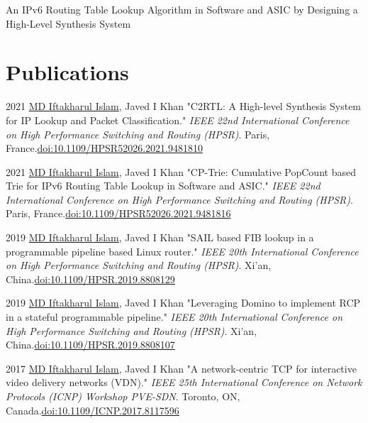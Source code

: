 \documentclass[11pt,letterpaper]{report}
\begin{document}
	An IPv6 Routing Table Lookup Algorithm in Software and ASIC by Designing a High-Level Synthesis System



    \section*{Publications}



    \begin{tablist}
        \item[2021] \tab{}\underline{MD Iftakharul Islam}, Javed I Khan "C2RTL: A High-level Synthesis System for IP Lookup and Packet Classification." \textit{IEEE 22nd International Conference on High Performance Switching and Routing (HPSR)}. Paris, France.\@ \href{https://ieeexplore.ieee.org/document/9481810}{doi:10.1109/HPSR52026.2021.9481810}
    	
        \item[2021] \tab{}\underline{MD Iftakharul Islam}, Javed I Khan "CP-Trie: Cumulative PopCount based Trie for IPv6 Routing Table Lookup in Software and ASIC." \textit{IEEE 22nd International Conference on High Performance Switching and Routing (HPSR)}. Paris, France.\@ \href{https://ieeexplore.ieee.org/document/9481816}{doi:10.1109/HPSR52026.2021.9481816}

        \item[2019] \tab{}\underline{MD Iftakharul Islam}, Javed I Khan "SAIL based FIB lookup in a programmable pipeline based Linux router." \textit{IEEE 20th International Conference on High Performance Switching and Routing (HPSR)}. Xi'an, China.\@ \href{https://ieeexplore.ieee.org/document/8808129}{doi:10.1109/HPSR.2019.8808129}

        \item[2019] \tab{}\underline{MD Iftakharul Islam}, Javed I Khan "Leveraging Domino to implement RCP in a stateful programmable pipeline." \textit{IEEE 20th International Conference on High Performance Switching and Routing (HPSR)}. Xi'an, China.\@ \href{https://ieeexplore.ieee.org/document/8808107}{doi:10.1109/HPSR.2019.8808107}
        
        \item[2017] \tab{}\underline{MD Iftakharul Islam}, Javed I Khan "A network-centric TCP for interactive video delivery networks (VDN)." \textit{IEEE 25th International Conference on Network Protocols (ICNP) Workshop PVE-SDN}. Toronto, ON, Canada.\@ \href{https://ieeexplore.ieee.org/document/8117596}{doi:10.1109/ICNP.2017.8117596}


\end{tablist}
\end{document}
